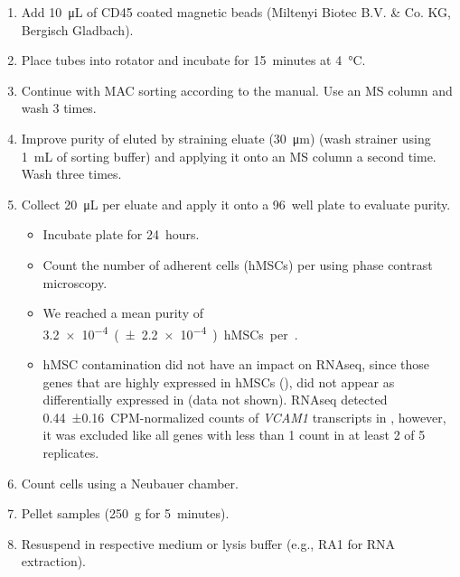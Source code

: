 \begin{itemize}
\begin{enumerate}
              \item Add \SI{10}{\micro\liter} of CD45 coated magnetic beads (Miltenyi Biotec B.V. \& Co. KG, Bergisch Gladbach).
              \item Place tubes into rotator and incubate for \SI{15}{minutes} at \SI{4}{\degreeCelsius}.
              \item Continue with MAC sorting according to the manual. Use an MS column and wash 3 times.
              \item Improve purity of eluted \MAina by straining eluate (\SI{30}{\micro\meter}) (wash strainer using \SI{1}{mL} of sorting buffer) and applying it onto an MS column a second time. Wash three times.
              \item Collect \SI{20}{\micro\liter} per eluate and apply it onto a \SI{96}{well} plate to evaluate purity.
                    \begin{itemize}
                        \item[a.] Incubate plate for \SI{24}{hours}.
                        \item[b.] Count the number of adherent cells (hMSCs) per \INA using phase contrast microscopy.
                        \item[c.] We reached a mean purity of \SI{3.2e-4} (±\SI{2.2e-4}) hMSCs per \MAina.
                        \item[d.] hMSC contamination did not have an impact on RNAseq, since those genes that are highly expressed in hMSCs (), did not appear as differentially expressed in \MAina (data not shown). RNAseq detected 0.44~±0.16~{CPM-normalized} counts of \textit{VCAM1} transcripts in \MAina, however, it was excluded like all genes with less than 1 count in at least 2 of 5 replicates.
                    \end{itemize}
              \item Count cells using a Neubauer chamber.
              \item Pellet samples (\SI{250}{g} for \SI{5}{minutes}).
              \item Resuspend in respective medium or lysis buffer (e.g., RA1 for RNA extraction).
          \end{enumerate}


\end{itemize}
